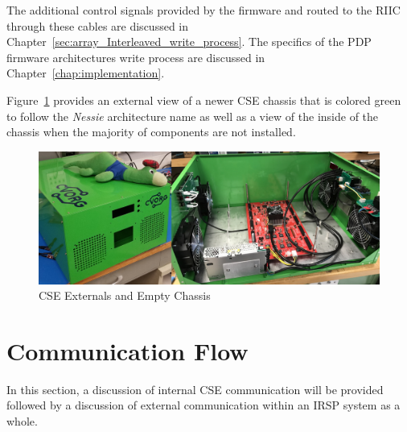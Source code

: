     The additional control signals provided by the firmware and routed to the RIIC through these cables are discussed in Chapter~\ref{sec:array_Interleaved_write_process}. The specifics of the PDP firmware architectures write process are discussed in Chapter~\ref{chap:implementation}.

    Figure~\ref{fig:nessie_enclosure_externals} provides an external view of a newer CSE chassis that is colored green to follow the {\it Nessie} architecture name as well as a view of the inside of the chassis when the majority of components are not installed.

    \begin{figure}
        \centering
        \includegraphics[width=1.0\textwidth]{fig/nessie_enclosure_externals.jpg}
        \caption{CSE Externals and Empty Chassis}
        \label{fig:nessie_enclosure_externals}
    \end{figure}

\section{Communication Flow}
    \label{sec:communication_flow}
    In this section, a discussion of internal CSE communication will be provided followed by a discussion of external communication within an IRSP system as a whole.

